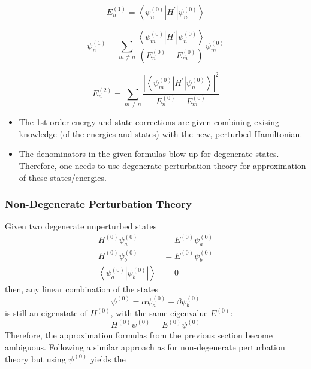 \newpar{}
\begin{equation*}
    E_{n}^{(1)}=\left\langle\psi_{n}^{(0)}\left| H^{\prime} \right|\psi_{n}^{(0)}\right\rangle
\end{equation*}

\begin{equation*}
    \psi_{n}^{(1)}=\sum_{m\neq n}\frac{\left\langle\psi_{m}^{(0)}\left|H^{\prime}\right|\psi_{n}^{(0)}\right\rangle}{\left(E_{n}^{(0)}-E_{m}^{(0)}\right)}\psi_{m}^{(0)}
\end{equation*}

\begin{equation*}
    E_{n}^{(2)}=\sum_{m\neq n}\frac{\left|\left\langle\psi_{m}^{(0)}\left|H^{\prime}\right|\psi_{n}^{(0)}\right\rangle\right|^{2}}{E_{n}^{(0)}-E_{m}^{(0)}}
\end{equation*}

\newpar{}
\begin{itemize}
    \item The 1st order energy and state corrections are given combining exising knowledge (of the energies and states) with the new, perturbed Hamiltonian.
    \item The denominators in the given formulas blow up for degenerate states. Therefore, one needs to use degenerate perturbation theory for approximation of these states/energies.
\end{itemize}

\subsubsection{Non-Degenerate Perturbation Theory}
Given two degenerate unperturbed states
\begin{align*}
    H^{(0)}\psi_a^{(0)}                                            & =E^{(0)}\psi_a^{(0)} \\
    H^{(0)}\psi_b^{(0)}                                            & =E^{(0)}\psi_b^{(0)} \\
    \left\langle\psi_a^{(0)}\left|\psi_b^{(0)}\right|\right\rangle & =0
\end{align*}
then, any linear combination of the states
\begin{equation*}
    \psi^{(0)}=\alpha\psi_a^{(0)}+\beta\psi_b^{(0)}
\end{equation*}
is still an eigenstate of $H^{(0)}$, with the same eigenvalue $E^{(0)}$:
\begin{equation*}
    H^{(0)}\psi^{(0)}=E^{(0)}\psi^{(0)}
\end{equation*}
Therefore, the approximation formulas from the previous section become ambiguous. Following a similar approach as for non-degenerate perturbation theory but using $\psi^{(0)}$ yields the

